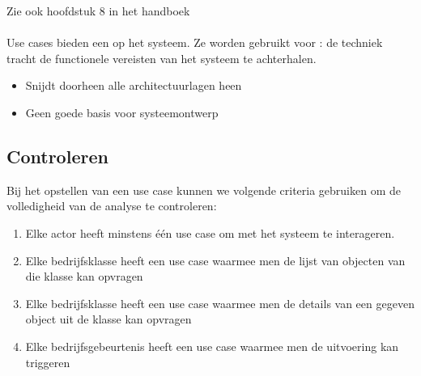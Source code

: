 \documentclass[../../main.tex]{subfiles}
\begin{document}
Zie ook hoofdstuk 8 in het handboek\\
\\
Use cases bieden een  op het systeem. Ze worden gebruikt voor : de techniek tracht de functionele vereisten van het systeem te achterhalen.
\begin{itemize}
	\item Snijdt doorheen alle architectuurlagen heen
	\item Geen goede basis voor systeemontwerp
\end{itemize}
\subsection{Controleren}
Bij het opstellen van een use case kunnen we volgende criteria gebruiken om de volledigheid van de analyse te controleren:
\begin{enumerate}
	\item Elke actor heeft minstens \'e\'en use case om met het systeem te interageren.
	\item Elke bedrijfsklasse heeft een use case waarmee men de lijst van objecten van die klasse kan opvragen
	\item Elke bedrijfsklasse heeft een use case waarmee men de details van een gegeven object uit de klasse kan opvragen
	\item Elke bedrijfsgebeurtenis heeft een use case waarmee men de uitvoering kan triggeren
\end{enumerate}
\end{document}

